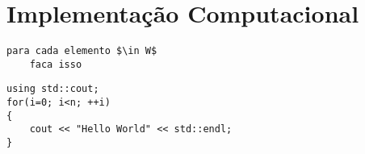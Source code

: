\chapter{Implementação Computacional} \label{ch:computational_implementation}



\begin{lstlisting}[style=pseudocode]
para cada elemento $\in W$
	faca isso
\end{lstlisting}

\begin{lstlisting}[style=C++]
using std::cout;
for(i=0; i<n; ++i)
{
	cout << "Hello World" << std::endl;
}
\end{lstlisting}